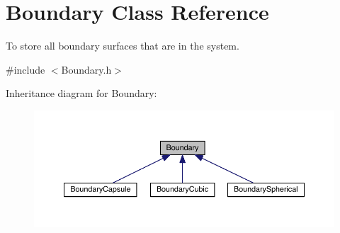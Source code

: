 \hypertarget{classBoundary}{\section{Boundary Class Reference}
\label{classBoundary}
}


To store all boundary surfaces that are in the system.  




{\ttfamily \#include $<$Boundary.\+h$>$}



Inheritance diagram for Boundary\+:\nopagebreak
\begin{figure}[H]
\begin{center}
\leavevmode
\includegraphics[width=350pt]{classBoundary__inherit__graph}
\end{center}
\end{figure}


